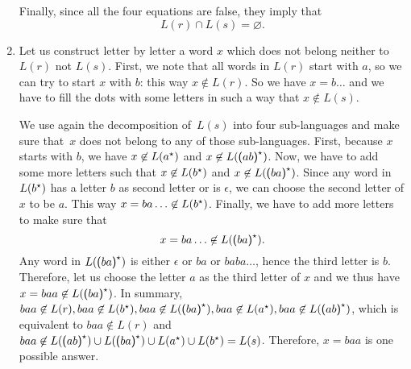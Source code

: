 \begin{enumerate}
\begin{enumerate}
      \end{enumerate}
      Finally, since all the four equations are false, they imply
      that
      \begin{equation*}
        L(r) \cap L(s) = \varnothing.
      \end{equation*}

    \item Let us construct letter by letter a word \(x\) which does
      not belong neither to \(L(r)\) not \(L(s)\). First, we note that
      all words in \(L(r)\) start with \(a\), so we can try to start
      \(x\) with \(b\): this way \(x \not\in L(r)\). So we have \(x =
      b\ldots\) and we have to fill the dots with some letters in such
      a way that \(x \not\in L(s)\).

      We use again the decomposition of~\(L(s)\) into four
      sub-languages and make sure that~\(x\) does not belong to any of
      those sub-languages. First, because \(x\) starts with \(b\), we
      have \(x \not\in L(a^{\star})\) and \(x \not\in L(\textsf{(}
      ab \textsf{)}^{\star})\). Now, we have to add some more letters
      such that \(x \not\in L(b^{\star})\) and \(x \not\in L(\textsf{(}
      ba \textsf{)}^{\star})\). Since any word in \(L(b^{\star})\) has a
      letter \(b\) as second letter or is \(\epsilon\), we can choose
      the second letter of \(x\) to be \(a\). This
      way \(x=ba\ldots \not\in L(b^{\star})\). Finally, we have to
      add more letters to make sure that
      \begin{equation*}
      x=ba\ldots \not\in L(\textsf{(} ba\textsf{)}^{\star}).
      \end{equation*}
      Any word in \(L(\textsf{(} ba\textsf{)}^{\star})\) is
      either \(\epsilon\) or \(ba\) or \(baba\ldots\), hence the third
      letter is \(b\). Therefore, let us choose the letter \(a\) as
      the third letter of \(x\) and we thus have \(x=baa \not\in
      L(\textsf{(} ba\textsf{)}^{\star})\). In summary, \(baa \not\in L(r),
      baa \not\in L(b^{\star}), baa \not\in L(\textsf{(}
      ba\textsf{)}^{\star}), baa \not\in L(a^{\star}), baa \not\in
      L(\textsf{(} ab\textsf{)}^{\star})\), which is equivalent
      to \(baa \not\in L(r)\) and \(baa \not\in L(\textsf{(}
      ab \textsf{)}^{\star}) \cup L(\textsf{(} ba \textsf{)}^{\star}) \cup
      L(a^{\star}) \cup L(b^{\star}) = L(s)\). Therefore, \(x=baa\) is
      one possible answer.

\end{enumerate}
